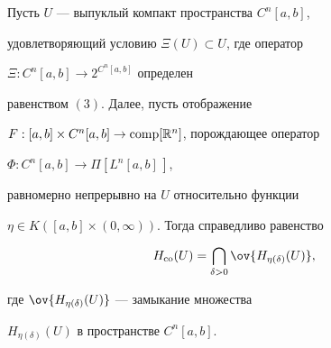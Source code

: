 \begin{thm} Пусть $U$ --- выпуклый компакт пространства $C^n[a,b]$,


удовлетворяющий условию $\Xi(U)\subset U$, где оператор


$\Xi:C^n[a,b]\to 2^{C^n[a,b]}$ определен


равенством $(3)$. Далее, пусть отображение


$F:[a,b]\times C^n[a,b]\to\operatorname{comp}[\Bbb R^n]$, порождающее оператор


$\Phi:C^n[a,b]\to \Pi[L^n[a,b]\,]$,


равномерно непрерывно на $U$ относительно функции


$\eta\in K([a,b]\times(0,\infty))$. Тогда справедливо равенство


\begin{equation}


H_{\co}(U)=\bigcap_{\delta>0}\ov{H_{\eta(\delta)}(U)},


\end{equation}


где $\ov{H_{\eta(\delta)}(U)}$ --- замыкание множества


$H_{\eta(\delta)}(U)$ в пространстве $C^n[a,b]$.


\end{thm}






